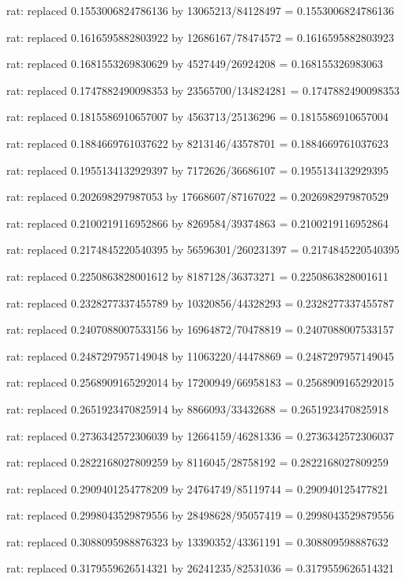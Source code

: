 \documentclass[a4paper,10pt]{article}
\begin{document}
\begin{eulernotebook}
\begin{eulercomment}
\begin{eulercomment}
\begin{eulercomment}
\begin{eulercomment}
\begin{eulercomment}
\begin{eulercomment}
\begin{eulercomment}
\begin{eulercomment}
\begin{eulercomment}
\begin{eulercomment}
\begin{eulercomment}
\begin{eulercomment}
\begin{eulercomment}
\begin{eulercomment}
\begin{eulercomment}
\begin{eulercomment}
\begin{euleroutput}
  rat: replaced 0.1553006824786136 by 13065213/84128497 = 0.1553006824786136
  
  rat: replaced 0.1616595882803922 by 12686167/78474572 = 0.1616595882803923
  
  rat: replaced 0.1681553269830629 by 4527449/26924208 = 0.168155326983063
  
  rat: replaced 0.1747882490098353 by 23565700/134824281 = 0.1747882490098353
  
  rat: replaced 0.1815586910657007 by 4563713/25136296 = 0.1815586910657004
  
  rat: replaced 0.1884669761037622 by 8213146/43578701 = 0.1884669761037623
  
  rat: replaced 0.1955134132929397 by 7172626/36686107 = 0.1955134132929395
  
  rat: replaced 0.202698297987053 by 17668607/87167022 = 0.2026982979870529
  
  rat: replaced 0.2100219116952866 by 8269584/39374863 = 0.2100219116952864
  
  rat: replaced 0.2174845220540395 by 56596301/260231397 = 0.2174845220540395
  
  rat: replaced 0.2250863828001612 by 8187128/36373271 = 0.2250863828001611
  
  rat: replaced 0.2328277337455789 by 10320856/44328293 = 0.2328277337455787
  
  rat: replaced 0.2407088007533156 by 16964872/70478819 = 0.2407088007533157
  
  rat: replaced 0.2487297957149048 by 11063220/44478869 = 0.2487297957149045
  
  rat: replaced 0.2568909165292014 by 17200949/66958183 = 0.2568909165292015
  
  rat: replaced 0.2651923470825914 by 8866093/33432688 = 0.2651923470825918
  
  rat: replaced 0.2736342572306039 by 12664159/46281336 = 0.2736342572306037
  
  rat: replaced 0.2822168027809259 by 8116045/28758192 = 0.2822168027809259
  
  rat: replaced 0.2909401254778209 by 24764749/85119744 = 0.290940125477821
  
  rat: replaced 0.2998043529879556 by 28498628/95057419 = 0.2998043529879556
  
  rat: replaced 0.3088095988876323 by 13390352/43361191 = 0.308809598887632
  
  rat: replaced 0.3179559626514321 by 26241235/82531036 = 0.3179559626514321
  

\end{euleroutput}
\end{eulercomment}
\end{eulercomment}
\end{eulercomment}
\end{eulercomment}
\end{eulercomment}
\end{eulercomment}
\end{eulercomment}
\end{eulercomment}
\end{eulercomment}
\end{eulercomment}
\end{eulercomment}
\end{eulercomment}
\end{eulercomment}
\end{eulercomment}
\end{eulercomment}
\end{eulercomment}
\end{eulernotebook}
\end{document}
